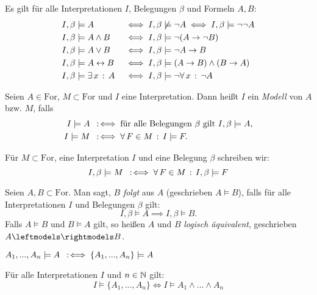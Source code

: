 \documentclass{cheat-sheet}
\newcommand{\Ibm}{I, \beta \models}
\newcommand{\Ibnm}{I, \beta \not\models}
\newcommand{\lra}{\leftrightarrow}
\newcommand{\For}{\mathrm{For}}
\newcommand{\eqmodels}{\leftmodels \rightmodels}
\begin{document}

\begin{prop}
  Es gilt für alle Interpretationen $I$, Belegungen $\beta$ und Formeln $A, B$:
  \begin{alignat*}{2}
    & \Ibm A &&\iff \Ibnm \neg A \iff \Ibm \neg\neg A\\
    & \Ibm A \wedge B &&\iff \Ibm \neg (A \to \neg B)\\
    & \Ibm A \vee B &&\iff \Ibm \neg A \to B\\
    & \Ibm A \lra B &&\iff \Ibm (A \to B) \wedge (B \to A)\\
    & \Ibm \ex{x} A &&\iff \Ibm \neg \fa{x} \neg A
  \end{alignat*}
\end{prop}


\begin{defn}
  Seien $A \in \For$, $M \subset \For$ und $I$ eine Interpretation. Dann heißt $I$ ein \emph{Modell} von $A$ bzw. $M$, falls
  \begin{align*}
    I \models A &\coloniff \text{für alle Belegungen $\beta$ gilt } \Ibm A,\\
    I \models M &\coloniff \fa{F \in M} I \models F.
  \end{align*}
\end{defn}

\begin{nota}
  Für $M \subset \For$, eine Interpretation $I$ und eine Belegung $\beta$ schreiben wir:
  \[ \Ibm M \coloniff \fa{F \in M} \Ibm F \]
\end{nota}

\begin{defn}
  Seien $A, B \subset \For$. Man sagt, $B$ \emph{folgt} aus $A$ (geschrieben $A \models B$), falls für alle Interpretationen $I$ und Belegungen $\beta$ gilt:
  \[ \Ibm A \implies \Ibm B. \]
  Falls $A \models B$ und $B \models A$ gilt, so heißen $A$ und $B$ \emph{logisch äquivalent}, geschrieben $A \eqmodels B$.
\end{defn}

\begin{nota}
  $A_1, ..., A_n \models A \enspace:\!\iff \{ A_1, ..., A_n \} \models A$
\end{nota}

\begin{satz}
  Für alle Interpretationen $I$ und $n \in \mathbb{N}$ gilt:
  \[ I \models \{ A_1, ..., A_n \} \iff I \models A_1 \wedge ... \wedge A_n \]
\end{satz}
\end{document}
